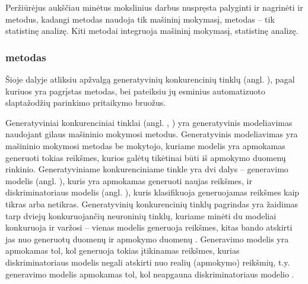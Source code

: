 \documentclass{VUMIFInfBakalaurinis}
\begin{document}
Peržiūrėjus aukščiau minėtus mokslinius darbus nuspręsta palyginti ir nagrinėti 
 ir  metodus, kadangi  
metodas naudoja tik mašininį mokymasį,  metodas -- tik 
statistinę analizę. Kiti metodai integruoja mašininį mokymasį, statistinę 
analizę.



\subsubsection{ metodas}
Šioje dalyje atliksiu apžvalgą generatyvinių konkurencinių tinklų (angl. 
), pagal kuriuos yra pagrįstas 
 metodas, bei pateiksiu jų esminius automatizuoto 
slaptažodžių parinkimo pritaikymo bruožus.

Generatyviniai konkurenciniai tinklai (angl. , ) yra generatyvinis modeliavimas naudojant gilaus 
mašininio mokymosi metodus. Generatyvinis modeliavimas yra mašininio mokymosi 
metodas be mokytojo, kuriame modelis yra apmokamas generuoti tokias reikšmes, 
kurios galėtų tikėtinai būti iš apmokymo duomenų rinkinio. Generatyviniame 
konkurenciniame tinkle yra dvi dalys -- generavimo modelis (angl. 
), kuris yra apmokamas generuoti naujas reikšmes, ir 
diskriminatoriaus modelis (angl. ), kuris 
klasifikuoja generuojamas reikšmes kaip tikras arba netikras. Generatyvinių 
konkurencinių tinklų pagrindas yra žaidimas tarp dviejų konkuruojančių 
neuroninių tinklų, kuriame minėti du modeliai konkuruoja ir varžosi -- vienas 
modelis generuoja reikšmes, kitas bando atskirti jas nuo generuotų duomenų ir 
apmokymo duomenų \cite{DL,GAN}. Generavimo modelis yra apmokamas tol, kol 
generuoja tokias įtikinamas reikšmes, kurias diskriminatoriaus modelis negali 
atskirti nuo realių (apmokymo) reikšmių, t.y. generavimo modelis apmokamas tol, 
kol neapgauna diskriminatoriaus modelio \cite{GAN}.
\end{document}
